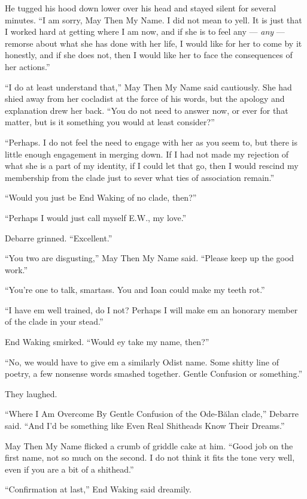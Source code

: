 He tugged his hood down lower over his head and stayed silent for several minutes. ``I am sorry, May Then My Name. I did not mean to yell. It is just that I worked hard at getting where I am now, and if she is to feel any — \emph{any} — remorse about what she has done with her life, I would like for her to come by it honestly, and if she does not, then I would like her to face the consequences of her actions.''

``I do at least understand that,'' May Then My Name said cautiously. She had shied away from her cocladist at the force of his words, but the apology and explanation drew her back. ``You do not need to answer now, or ever for that matter, but is it something you would at least consider?''

``Perhaps. I do not feel the need to engage with her as you seem to, but there is little enough engagement in merging down. If I had not made my rejection of what she is a part of my identity, if I could let that go, then I would rescind my membership from the clade just to sever what ties of association remain.''

``Would you just be End Waking of no clade, then?''

``Perhaps I would just call myself E.W., my love.''

Debarre grinned. ``Excellent.''

``You two are disgusting,'' May Then My Name said. ``Please keep up the good work.''

``You're one to talk, smartass. You and Ioan could make my teeth rot.''

``I have em well trained, do I not? Perhaps I will make em an honorary member of the clade in your stead.''

End Waking smirked. ``Would ey take my name, then?''

``No, we would have to give em a similarly Odist name. Some shitty line of poetry, a few nonsense words smashed together. Gentle Confusion or something.''

They laughed.

``Where I Am Overcome By Gentle Confusion of the Ode-Bălan clade,'' Debarre said. ``And I'd be something like Even Real Shitheads Know Their Dreams.''

May Then My Name flicked a crumb of griddle cake at him. ``Good job on the first name, not so much on the second. I do not think it fits the tone very well, even if you are a bit of a shithead.''

``Confirmation at last,'' End Waking said dreamily.
